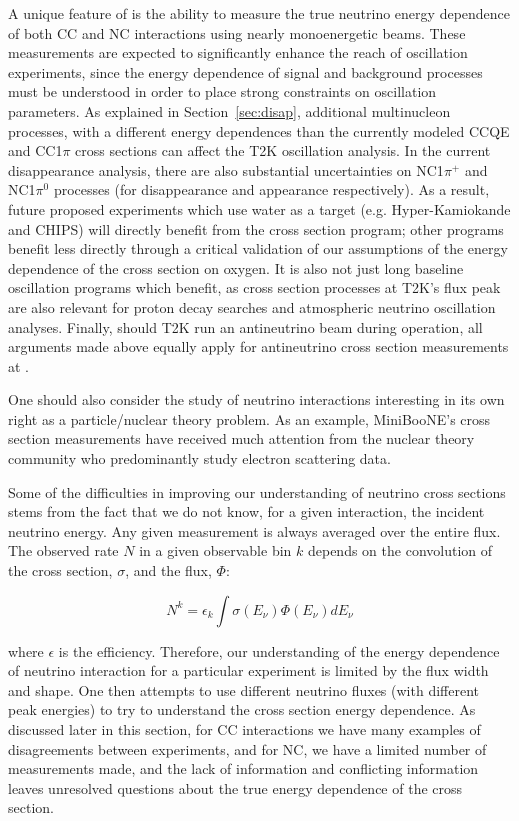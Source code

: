 A unique feature of \nuprismlite is the ability to measure the true neutrino energy dependence of both CC and NC interactions using nearly monoenergetic beams. These measurements are expected to significantly enhance the reach of oscillation experiments, since the energy dependence of signal and background processes must be understood in order to place strong constraints on oscillation parameters. As explained in Section~\ref{sec:disap},  additional multinucleon processes, with a different energy dependences than the currently modeled CCQE and CC1$\pi$ cross sections can affect the T2K oscillation analysis. In the current disappearance analysis, there are also substantial uncertainties on NC1$\pi^+$ and NC1$\pi^0$ processes (for disappearance and appearance respectively). As a result, future proposed experiments which use water as a target (e.g. Hyper-Kamiokande and CHIPS) will directly benefit from the \nuprismlite cross section program; other programs benefit less directly through a critical validation of our assumptions of the energy dependence of the cross section on oxygen.
It is also not just long baseline oscillation programs which benefit, as cross section processes at T2K's flux peak are also relevant for proton decay searches and atmospheric neutrino oscillation analyses. Finally, should T2K run an antineutrino beam during \nuprismlite operation, all arguments made above equally apply for  antineutrino cross section measurements at \nuprismlite.
 
One should also consider the study of neutrino interactions interesting in its own right as a particle/nuclear theory problem. As an example, MiniBooNE's cross section measurements have received much attention from the nuclear theory community who predominantly study electron scattering data.

Some of the difficulties in improving our understanding of neutrino cross sections stems from the fact that we do not know, for a given interaction, the incident neutrino energy. Any given measurement is always averaged over the entire flux. The observed rate $N$ in a given observable bin $k$ depends on the convolution of the cross section, $\sigma$, and the flux, $\Phi$:

\begin{equation}
N^k  = \epsilon_k  \int \sigma(E_\nu) \Phi(E_\nu) dE_\nu
\end{equation}

where $\epsilon$ is the efficiency. Therefore, our understanding of the energy dependence of neutrino interaction for a particular experiment is limited by the flux width and shape. One then attempts to use different neutrino fluxes (with different peak energies) to try to understand the cross section energy dependence. As discussed later in this section, for CC interactions we have many examples of disagreements between experiments, and for NC, we have a limited number of measurements made, and the lack of information and conflicting information leaves unresolved questions about the true energy dependence of the cross section.

